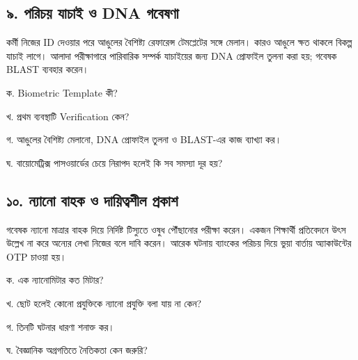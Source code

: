 \subsection{৯. পরিচয় যাচাই ও DNA গবেষণা}
কর্মী নিজের ID দেওয়ার পরে আঙুলের বৈশিষ্ট্য রেফারেন্স টেমপ্লেটের সঙ্গে মেলান। কারও আঙুলে ক্ষত থাকলে বিকল্প যাচাই লাগে। আলাদা পরীক্ষাগারে পারিবারিক সম্পর্ক যাচাইয়ের জন্য DNA প্রোফাইল তুলনা করা হয়; গবেষক BLAST ব্যবহার করেন।
\begin{compactenum}
\item ক. Biometric Template কী?

\item খ. প্রথম ব্যবস্থাটি Verification কেন?

\item গ. আঙুলের বৈশিষ্ট্য মেলানো, DNA প্রোফাইল তুলনা ও BLAST-এর কাজ ব্যাখ্যা কর।

\item ঘ. বায়োমেট্রিক্স পাসওয়ার্ডের চেয়ে নিরাপদ হলেই কি সব সমস্যা দূর হয়?

\end{compactenum}

\subsection{১০. ন্যানো বাহক ও দায়িত্বশীল প্রকাশ}
গবেষক ন্যানো মাত্রার বাহক দিয়ে নির্দিষ্ট টিস্যুতে ওষুধ পৌঁছানোর পরীক্ষা করেন। একজন শিক্ষার্থী প্রতিবেদনে উৎস উল্লেখ না করে অন্যের লেখা নিজের বলে দাবি করেন। আরেক ঘটনায় ব্যাংকের পরিচয় দিয়ে ভুয়া বার্তায় অ্যাকাউন্টের OTP চাওয়া হয়।
\begin{compactenum}
\item ক. এক ন্যানোমিটার কত মিটার?

\item খ. ছোট হলেই কোনো প্রযুক্তিকে ন্যানো প্রযুক্তি বলা যায় না কেন?

\item গ. তিনটি ঘটনার ধারণা শনাক্ত কর।

\item ঘ. বৈজ্ঞানিক অগ্রগতিতে নৈতিকতা কেন জরুরি?

\end{compactenum}

